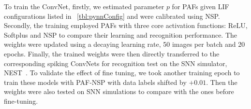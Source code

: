 	To train the ConvNet, firstly, we estimated parameter $p$ for PAFs given LIF configurations listed in \DIFdelbegin {}\DIFdelend \DIFaddbegin {}\DIFaddend ~\ref{tbl:pynnConfig} and \DIFdelbegin {}\DIFdelend \DIFaddbegin {}\DIFaddend were calibrated using NSP. 
	Secondly, the training employed PAFs with three core activation functions: ReLU, Softplus and NSP to compare their learning and recognition performance.
	The weights were updated using a decaying learning rate, 50 images per batch and 20 epochs.
	Finally, the trained weights were then directly transferred to the corresponding spiking ConvNets for recognition test on the SNN simulator, NEST~\citep{gewaltig2007nest}.
	To validate the effect of fine tuning, we took another training epoch to train these models with PAF-NSP with data labels shifted by $+0.01$.
	Then the weights were also tested on SNN simulations to compare with the ones before fine-tuning.

